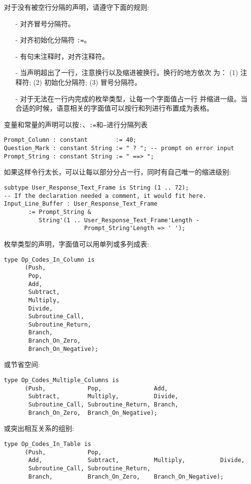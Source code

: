 \begin{blockindent}
对于没有被空行分隔的声明，请遵守下面的规则:
    \begin{itemize}
	\item[-] 对齐冒号分隔符。
	\item[-] 对齐初始化分隔符 \texttt{:=}。
	\item[-] 有句末注释时，对齐注释符。
	\item[-] 当声明超出了一行，注意换行以及缩进被换行。换行的地方依次
为： (1) 注释符; (2) 初始化分隔符; (3) 冒号分隔符。
	\item[-] 对于无法在一行内完成的枚举类型，让每一个字面值占一行
并缩进一级。当合适的时候，语意相关的字面值可以按行和列进行布置成为表格。
    \end{itemize}
\end{blockindent}

\begin{blockindent}
变量和常量的声明可以按\texttt{:}、\texttt{:=}和\texttt{--}进行分隔列表\\
\begin{lstlisting}
Prompt_Column : constant        := 40;
Question_Mark : constant String := " ? "; -- prompt on error input
Prompt_String : constant String := " ==> ";
\end{lstlisting}
如果这样令行太长，可以让每以部分分占一行，同时有自己唯一的缩进级别:
\begin{lstlisting}
subtype User_Response_Text_Frame is String (1 .. 72);
-- If the declaration needed a comment, it would fit here.
Input_Line_Buffer : User_Response_Text_Frame
       := Prompt_String &
          String'(1 .. User_Response_Text_Frame'Length -
                       Prompt_String'Length => ' ');
\end{lstlisting}
枚举类型的声明，字面值可以用单列或多列成表:
\begin{lstlisting}
type Op_Codes_In_Column is
      (Push,
       Pop,
       Add,
       Subtract,
       Multiply,
       Divide,
       Subroutine_Call,
       Subroutine_Return,
       Branch,
       Branch_On_Zero,
       Branch_On_Negative);
\end{lstlisting}
或节省空间:
\begin{lstlisting}
type Op_Codes_Multiple_Columns is
      (Push,            Pop,               Add,
       Subtract,        Multiply,          Divide,
       Subroutine_Call, Subroutine_Return, Branch,
       Branch_On_Zero,  Branch_On_Negative);
\end{lstlisting}
或突出相互关系的组别:
\begin{lstlisting}
type Op_Codes_In_Table is
      (Push,            Pop,
       Add,             Subtract,          Multiply,          Divide,
       Subroutine_Call, Subroutine_Return,
       Branch,          Branch_On_Zero,    Branch_On_Negative);
\end{lstlisting}
\end{blockindent}

